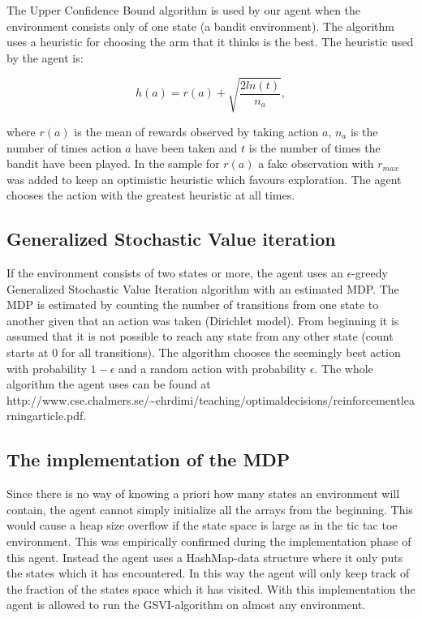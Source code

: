 \documentclass[11pt]{article}
\numberwithin{equation}{section}
\begin{document}
\begin{flushleft}
The Upper Confidence Bound algorithm is used by our agent when the environment consists only of one state (a bandit environment). The algorithm uses a heuristic for choosing the arm that it thinks is the best. The heuristic used by the agent is:

$$h(a) = r(a) + \sqrt{\frac{2ln(t)}{n_a}},$$

where $r(a)$ is the mean of rewards observed by taking action $a$, $n_a$ is the number of times action $a$ have been taken and $t$ is the number of times the bandit have been played. In the sample for $r(a)$ a fake observation with $r_{max}$ was added to keep an optimistic heuristic which favours exploration. The agent chooses the action with the greatest heuristic at all times.

\subsection{Generalized Stochastic Value iteration}

If the environment consists of two states or more, the agent uses an $\epsilon$-greedy Generalized Stochastic Value Iteration algorithm with an estimated MDP. The MDP is estimated by counting the number of transitions from one state to another given that an action was taken (Dirichlet model). From beginning it is assumed that it is not possible to reach any state from any other state (count starts at 0 for all transitions). The algorithm chooses the seemingly best action with probability $1-\epsilon$ and a random action with probability $\epsilon$. The whole algorithm the agent uses can be found at http://www.cse.chalmers.se/\textasciitilde chrdimi/teaching/optimal\textunderscore decisions/reinforcement\textunderscore learning\textunderscore article.pdf.

\subsection{The implementation of the MDP}

Since there is no way of knowing a priori how many states an environment will contain, the agent cannot simply initialize all the arrays from the beginning. This would cause a heap size overflow if the state space is large as in the tic tac toe environment. This was empirically confirmed during the implementation phase of this agent. Instead the agent uses a HashMap-data structure where it only puts the states which it has encountered. In this way the agent will only keep track of the fraction of the states space which it has visited. With this implementation the agent is allowed to run the GSVI-algorithm on almost any environment.  


\end{flushleft}
\end{document}
